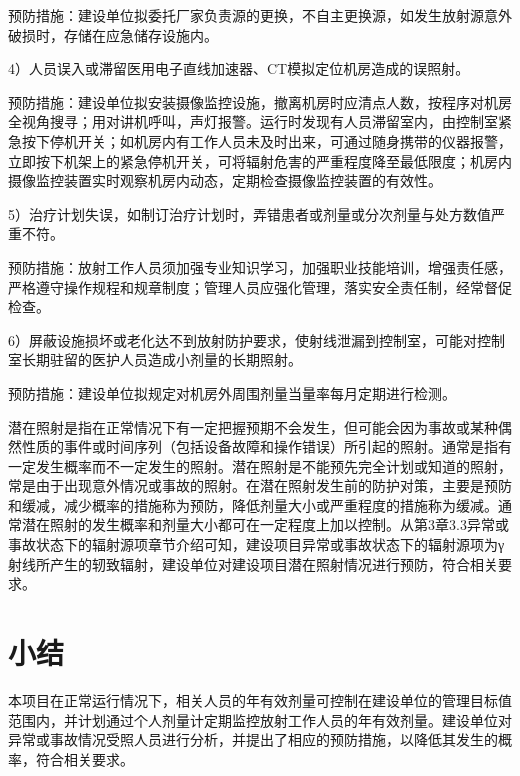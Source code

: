 预防措施：建设单位拟委托厂家负责源的更换，不自主更换源，如发生放射源意外破损时，存储在应急储存设施内。

4）人员误入或滞留医用电子直线加速器、CT模拟定位机房造成的误照射。

预防措施：建设单位拟安装摄像监控设施，撤离机房时应清点人数，按程序对机房全视角搜寻；用对讲机呼叫，声灯报警。运行时发现有人员滞留室内，由控制室紧急按下停机开关；如机房内有工作人员未及时出来，可通过随身携带的仪器报警，立即按下机架上的紧急停机开关，可将辐射危害的严重程度降至最低限度；机房内摄像监控装置实时观察机房内动态，定期检查摄像监控装置的有效性。

5）治疗计划失误，如制订治疗计划时，弄错患者或剂量或分次剂量与处方数值严重不符。

预防措施：放射工作人员须加强专业知识学习，加强职业技能培训，增强责任感，严格遵守操作规程和规章制度；管理人员应强化管理，落实安全责任制，经常督促检查。

6）屏蔽设施损坏或老化达不到放射防护要求，使射线泄漏到控制室，可能对控制室长期驻留的医护人员造成小剂量的长期照射。

预防措施：建设单位拟规定对机房外周围剂量当量率每月定期进行检测。

潜在照射是指在正常情况下有一定把握预期不会发生，但可能会因为事故或某种偶然性质的事件或时间序列（包括设备故障和操作错误）所引起的照射。通常是指有一定发生概率而不一定发生的照射。潜在照射是不能预先完全计划或知道的照射，常是由于出现意外情况或事故的照射。在潜在照射发生前的防护对策，主要是预防和缓减，减少概率的措施称为预防，降低剂量大小或严重程度的措施称为缓减。通常潜在照射的发生概率和剂量大小都可在一定程度上加以控制。从第3章3.3异常或事故状态下的辐射源项章节介绍可知，建设项目异常或事故状态下的辐射源项为γ射线所产生的轫致辐射，建设单位对建设项目潜在照射情况进行预防，符合相关要求。

\section{小结}

本项目在正常运行情况下，相关人员的年有效剂量可控制在建设单位的管理目标值范围内，并计划通过个人剂量计定期监控放射工作人员的年有效剂量。建设单位对异常或事故情况受照人员进行分析，并提出了相应的预防措施，以降低其发生的概率，符合相关要求。
